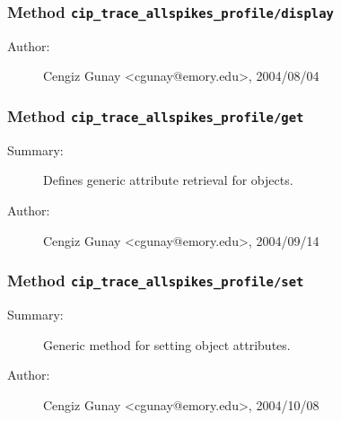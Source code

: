 \subsubsection[Method \texttt{display}]{Method \texttt{cip\_trace\_allspikes\_profile/display}}%
%
\label{ref_cip_trace_allspikes_profile__display}%
\hypertarget{ref_cip_trace_allspikes_profile__display}{}%
\begin{description}
%
%
%
%
%
%
%
\item[Author:]%
Cengiz Gunay <cgunay@emory.edu>, 2004/08/04%
\end{description}
\methodline%
\subsubsection[Method \texttt{get}]{Method \texttt{cip\_trace\_allspikes\_profile/get}}%
%
\label{ref_cip_trace_allspikes_profile__get}%
\hypertarget{ref_cip_trace_allspikes_profile__get}{}%
\begin{description}
\item[Summary:]Defines generic attribute retrieval for objects.
%
%
%
%
%
%
%
\item[Author:]%
Cengiz Gunay <cgunay@emory.edu>, 2004/09/14%
\end{description}
\methodline%
\subsubsection[Method \texttt{set}]{Method \texttt{cip\_trace\_allspikes\_profile/set}}%
%
\label{ref_cip_trace_allspikes_profile__set}%
\hypertarget{ref_cip_trace_allspikes_profile__set}{}%
\begin{description}
\item[Summary:]Generic method for setting object attributes.
%
%
%
%
%
%
%
\item[Author:]%
Cengiz Gunay <cgunay@emory.edu>, 2004/10/08%
\end{description}
\methodline%
